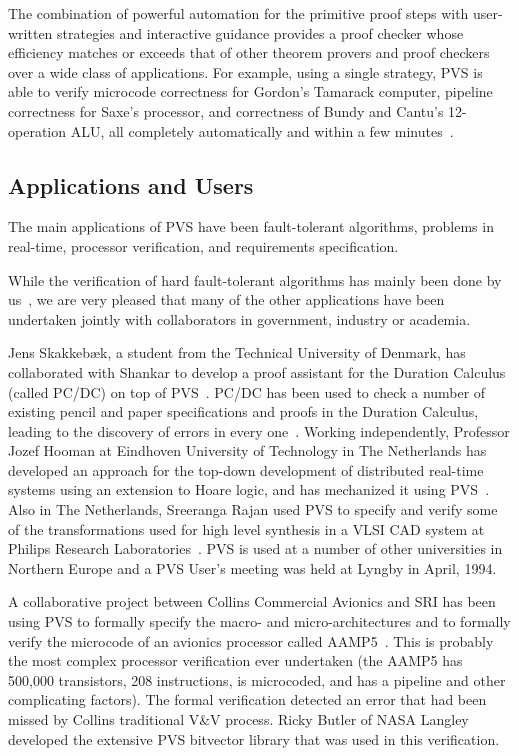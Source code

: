 The combination of powerful automation for the primitive proof steps
with user-written strategies and interactive guidance provides a proof
checker whose efficiency matches or exceeds that of other theorem
provers and proof checkers over a wide class of applications.  For
example, using a single strategy, PVS is able to verify microcode
correctness for Gordon's Tamarack computer, pipeline correctness
for Saxe's processor, and correctness of Bundy and Cantu's
12-operation ALU, all completely automatically and within a few
minutes~\cite{Cyrluk94:TPCD}.

\subsection{Applications and Users}

The main applications of PVS have been fault-tolerant algorithms,
problems in real-time, processor verification, and requirements
specification.

While the verification of hard fault-tolerant algorithms has mainly
been done by
us~\cite{Lincoln&Rushby93:CAV,Lincoln&Rushby93:FTCS,Lincoln&Rushby94:FTP,Owre-etal:FME93,Rushby94:icah},
we are very pleased that many of the other applications have been
undertaken jointly with collaborators in government, industry or
academia.

Jens Skakkeb{\ae}k, a student from the Technical University of
Denmark, has collaborated with Shankar to develop a proof assistant
for the Duration Calculus (called PC/DC) on top of
PVS~\cite{Skakkebaek&Shankar94}.  PC/DC has been used to check a
number of existing pencil and paper specifications and proofs in the Duration
Calculus, leading to the discovery of errors in every
one~\cite{Inal&Jens94}.  Working independently, Professor Jozef Hooman
at Eindhoven University of Technology in The Netherlands has developed
an approach for the top-down development of distributed real-time
systems using an extension to Hoare logic, and has mechanized it using
PVS~\cite{Hooman94}.  Also in The Netherlands, Sreeranga Rajan used
PVS to specify and verify some of the transformations used for high
level synthesis in a VLSI CAD system at Philips Research
Laboratories~\cite{Sree94:Philips}.
PVS is used at a number of other universities in Northern Europe and a
PVS User's meeting was held at Lyngby in April, 1994.

A collaborative project between Collins Commercial Avionics and SRI
has been using PVS to formally specify the macro- and
micro-architectures and to formally verify the microcode of an
avionics processor called AAMP5~\cite{Miller&Srivas95}.  This is
probably the most complex processor verification ever undertaken (the
AAMP5 has 500,000 transistors, 208 instructions, is microcoded, and
has a pipeline and other complicating factors).  The formal
verification detected an error that had been missed by Collins
traditional V\&V process.  Ricky Butler of NASA Langley developed the
extensive PVS bitvector library that was used in this verification.

